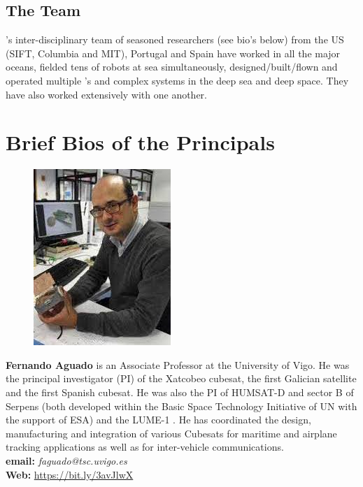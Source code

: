 \documentclass[12pt]{article}
\begin{document}
\subsection{The Team}

\proe’s inter-disciplinary team of seasoned researchers (see bio's
below) from the US (SIFT, Columbia and MIT), Portugal and Spain have
worked in all the major oceans, fielded tens of robots at sea
simultaneously, designed/built/flown and operated multiple \smle's and
complex systems in the deep sea and deep space. They have also worked
extensively with one another.

\section{Brief Bios of the Principals}

\parbox{6.5in}{
\begin{figure}
  \centering
  \includegraphics[width=.75\linewidth]{fig/FAguado.jpg}
\end{figure}
\textbf{Fernando Aguado} is an Associate Professor at the University
of Vigo. He was the principal investigator (PI) of the Xatcobeo
cubesat, the first Galician satellite and the first Spanish
cubesat. He was also the PI of HUMSAT-D and sector B of Serpens (both
developed within the Basic Space Technology Initiative of UN with the
support of ESA) and the LUME-1 \smle. He has coordinated the design,
manufacturing and integration of various Cubesats for maritime and
airplane tracking applications as well as for inter-vehicle
communications. 
\\
\textbf{email: }\emph{faguado@tsc.uvigo.es} \\
\textbf{Web: }\url{https://bit.ly/3avJlwX}\\
}
\end{document}
